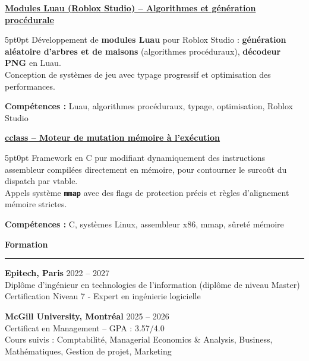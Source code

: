 \documentclass[9pt]{extarticle}
\begin{document}
\par\vspace{8pt}

\underline{\bfseries Modules Luau (Roblox Studio) -- Algorithmes et génération procédurale}
\par
\begin{adjustwidth}{5pt}{0pt}
    Développement de {\bfseries modules Luau} pour Roblox Studio : {\bfseries génération aléatoire d'arbres et de maisons} (algorithmes procéduraux), {\bfseries décodeur PNG} en Luau. \\
    Conception de systèmes de jeu avec typage progressif et optimisation des performances.
\end{adjustwidth}
\par
{\bfseries Compétences :} Luau, algorithmes procéduraux, typage, optimisation, Roblox Studio

\par\vspace{8pt}

\underline{\bfseries \href{https://github.com/paulogarithm/cclass}{cclass} -- Moteur de mutation mémoire à l'exécution}
\par
\begin{adjustwidth}{5pt}{0pt}
    Framework en C pur modifiant dynamiquement des instructions assembleur compilées directement en mémoire, pour contourner le surcoût du dispatch par vtable. \\
    Appels système {\bfseries \texttt{mmap}} avec des flags de protection précis et règles d'alignement mémoire strictes.
\end{adjustwidth}
\par
{\bfseries Compétences :} C, systèmes Linux, assembleur x86, mmap, sûreté mémoire

\par\vspace{8pt}

{\large\bfseries Formation}
\par\vspace{-8pt}
\rule{\linewidth}{0.4pt}
\par\vspace{5pt}

{\bfseries Epitech, Paris} \hfill 2022 -- 2027 \\
Diplôme d'ingénieur en technologies de l'information (diplôme de niveau Master) \\
Certification Niveau 7 - Expert en ingénierie logicielle

\vspace{6pt}

{\bfseries McGill University, Montréal} \hfill 2025 -- 2026 \\
Certificat en Management -- GPA : 3.57/4.0 \\
Cours suivis : Comptabilité, Managerial Economics \& Analysis, Business, Mathématiques, Gestion de projet, Marketing
\end{document}
